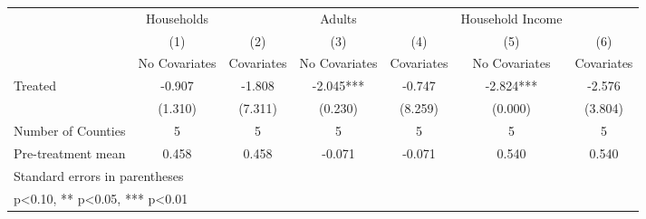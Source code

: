 {
\def\sym#1{\ifmmode^{#1}\else\(^{#1}\)\fi}
\begin{tabular}{l*{6}{c}}
\hline\hline
            &  Households   &               &      Adults   &               &Household Income   &               \\
            &\multicolumn{1}{c}{(1)}&\multicolumn{1}{c}{(2)}&\multicolumn{1}{c}{(3)}&\multicolumn{1}{c}{(4)}&\multicolumn{1}{c}{(5)}&\multicolumn{1}{c}{(6)}\\
            &\multicolumn{1}{c}{No Covariates}&\multicolumn{1}{c}{Covariates}&\multicolumn{1}{c}{No Covariates}&\multicolumn{1}{c}{Covariates}&\multicolumn{1}{c}{No Covariates}&\multicolumn{1}{c}{Covariates}\\
\hline
Treated     &      -0.907   &      -1.808   &      -2.045***&      -0.747   &      -2.824***&      -2.576   \\
            &     (1.310)   &     (7.311)   &     (0.230)   &     (8.259)   &     (0.000)   &     (3.804)   \\
\hline
Number of Counties&           5   &           5   &           5   &           5   &           5   &           5   \\
Pre-treatment mean&       0.458   &       0.458   &      -0.071   &      -0.071   &       0.540   &       0.540   \\
\hline\hline
\multicolumn{7}{l}{\footnotesize Standard errors in parentheses}\\
\multicolumn{7}{l}{\footnotesize * p<0.10, ** p<0.05, *** p<0.01}\\
\end{tabular}
}
